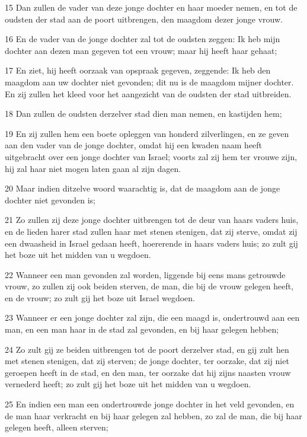 \par 15 Dan zullen de vader van deze jonge dochter en haar moeder nemen, en tot de oudsten der stad aan de poort uitbrengen, den maagdom dezer jonge vrouw.
\par 16 En de vader van de jonge dochter zal tot de oudsten zeggen: Ik heb mijn dochter aan dezen man gegeven tot een vrouw; maar hij heeft haar gehaat;
\par 17 En ziet, hij heeft oorzaak van opspraak gegeven, zeggende: Ik heb den maagdom aan uw dochter niet gevonden; dit nu is de maagdom mijner dochter. En zij zullen het kleed voor het aangezicht van de oudsten der stad uitbreiden.
\par 18 Dan zullen de oudsten derzelver stad dien man nemen, en kastijden hem;
\par 19 En zij zullen hem een boete opleggen van honderd zilverlingen, en ze geven aan den vader van de jonge dochter, omdat hij een kwaden naam heeft uitgebracht over een jonge dochter van Israel; voorts zal zij hem ter vrouwe zijn, hij zal haar niet mogen laten gaan al zijn dagen.
\par 20 Maar indien ditzelve woord waarachtig is, dat de maagdom aan de jonge dochter niet gevonden is;
\par 21 Zo zullen zij deze jonge dochter uitbrengen tot de deur van haars vaders huis, en de lieden harer stad zullen haar met stenen stenigen, dat zij sterve, omdat zij een dwaasheid in Israel gedaan heeft, hoererende in haars vaders huis; zo zult gij het boze uit het midden van u wegdoen.
\par 22 Wanneer een man gevonden zal worden, liggende bij eens mans getrouwde vrouw, zo zullen zij ook beiden sterven, de man, die bij de vrouw gelegen heeft, en de vrouw; zo zult gij het boze uit Israel wegdoen.
\par 23 Wanneer er een jonge dochter zal zijn, die een maagd is, ondertrouwd aan een man, en een man haar in de stad zal gevonden, en bij haar gelegen hebben;
\par 24 Zo zult gij ze beiden uitbrengen tot de poort derzelver stad, en gij zult hen met stenen stenigen, dat zij sterven; de jonge dochter, ter oorzake, dat zij niet geroepen heeft in de stad, en den man, ter oorzake dat hij zijns naasten vrouw vernederd heeft; zo zult gij het boze uit het midden van u wegdoen.
\par 25 En indien een man een ondertrouwde jonge dochter in het veld gevonden, en de man haar verkracht en bij haar gelegen zal hebben, zo zal de man, die bij haar gelegen heeft, alleen sterven;
